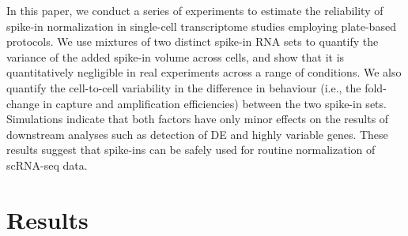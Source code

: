 \documentclass{article}
\begin{document}
In this paper, we conduct a series of experiments to estimate the reliability of spike-in normalization in single-cell transcriptome studies employing plate-based protocols.
We use mixtures of two distinct spike-in RNA sets to quantify the variance of the added spike-in volume across cells, 
and show that it is quantitatively negligible in real experiments across a range of conditions. 
We also quantify the cell-to-cell variability in the difference in behaviour (i.e., the fold-change in capture and amplification efficiencies) between the two spike-in sets.
Simulations indicate that both factors have only minor effects on the results of downstream analyses such as detection of DE and highly variable genes.
These results suggest that spike-ins can be safely used for routine normalization of scRNA-seq data.

% 

\section{Results}

\newcommand\variance{\mbox{var}}
\end{document}
